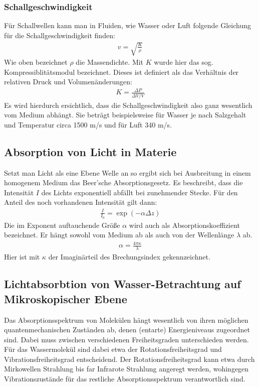 \documentclass[12pt,a4paper,titlepage,headinclude,bibtotoc]{scrartcl}
\begin{document}
\subsubsection{Schallgeschwindigkeit}
Für Schallwellen kann man in Fluiden, wie Wasser oder Luft folgende Gleichung für die Schallgeschwindigkeit finden:
\begin{align}
 v = \sqrt{  \frac{K}{\rho}  }
\end{align}
Wie oben bezeichnet $\rho$ die Massendichte. Mit $K$ wurde hier das sog. Kompressiblitätsmodul bezeichnet. Dieses ist definiert als das Verhältnis der relativen Druck und Volumenänderungen:
\begin{align}
 K =  \frac{\Delta P}{\Delta V / V }
\end{align}
Es wird hierdurch ersichtlich, dass die Schallgeschwindigkeit also ganz wesentlich vom Medium abhängt. 
Sie beträgt beispielsweise für Wasser je nach Salzgehalt und Temperatur circa 1500 m/s  und für Luft 340 m/s.

\subsection{Absorption von Licht in Materie}
Setzt man Licht als eine Ebene Welle an so ergibt sich bei Ausbreitung in einem homogenem Medium das Beer'sche Absorptionsgesetz.
Es beschreibt, dass die Intensität $I$ des Lichts exponentiell abfällt bei zunehmender Stecke.
Für den Anteil des noch vorhandenen Intensität gilt dann:
\begin{align}
 \frac{I}{I_0}  =  \exp(- \alpha  \Delta z)
\end{align}
Die im Exponent auftauchende Größe $\alpha$ wird auch als Absorptionskoeffizient bezeichnet. Er hängt sowohl vom Medium ab als auch von der Wellenlänge $\lambda$ ab.
\begin{align}
 \alpha= \frac{4 \pi \kappa}{\lambda}
\end{align}
Hier ist mit $\kappa$ der Imaginärteil des Brechungsindex gekennzeichnet.

\subsection{Lichtabsorbtion von Wasser-Betrachtung auf Mikroskopischer Ebene}
Das Absorptionsspektrum von Molekülen hängt wesentlich von ihren möglichen 
quantenmechanischen Zuständen ab, denen (entarte) Energieniveaus zugeordnet sind. Dabei muss zwischen verschiedenen Freiheitsgraden
unterschieden werden. Für das Wassermolekül sind dabei etwa der Rotationsfreiheitsgrad und Vibrationsfreiheitsgrad entscheidend.
Der Rotationsfreiheitsgrad kann etwa durch Mirkowellen Strahlung bis far Infrarote Strahlung angeregt werden, wohingegen Vibrationszustände für das restliche Absorptionsspektrum verantwortlich sind.
\end{document}
